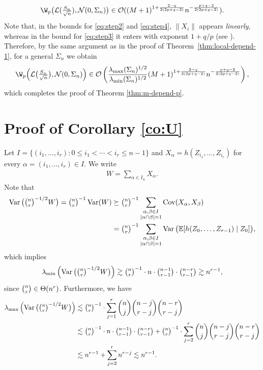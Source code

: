 \documentclass[mnsc,nonblindrev]{informs3}
\begin{document}
\[
\W_p\big(\mathcal{L}(\tfrac{S_n}{\sqrt{n}}),\mathcal{N}(0,\Sigma_n)\big)
\in \mathcal O( (M+1)^{1 + \frac{2-q}{2(2p+q-2)}} n^{-\frac{p+q-2}{2(2 p+q-2)}}).
\]
Note that, in the bounds for \eqref{eq:step2} and \eqref{eq:step4}, 
$\|X_i\|$ appears \emph{linearly}, whereas in the bound for
\eqref{eq:step3} it enters with exponent $1+q/p$ (see \cite[Theorem~6]{bonis2020stein}).
Therefore, by the same argument as in the proof of Theorem~\ref{thm:local-depend-1}, for a general
$\Sigma_n$ we obtain
\[
\W_p\Big(\mathcal{L}\big(\tfrac{S_n}{\sqrt{n}}\big),\mathcal{N}(0,\Sigma_n)\Big)
\in
\mathcal{O}\left(
\frac{\lambda_{\max}(\Sigma_n)^{1/2}}{\lambda_{\min}(\Sigma_n)^{1/2}}
(M+1)^{1+\frac{2-q}{2(2p+q-2)}}
n^{-\frac{p+q-2}{2(2p+q-2)}}
\right),
\]
which completes the proof of Theorem \ref{thm:m-depend-p}.
\section{Proof of Corollary \ref{co:U}}\label{sec:proof-U}
Let $I = \{(i_1, \dots, i_r): 0 \leq i_1<\cdots<i_r\leq n-1\}$ and $X_\alpha = h(Z_{i_1}, \dots, Z_{i_r})$ for every $\alpha = (i_1, \dots, i_r) \in I$. We write 
\begin{align*}
W = \sum_{\alpha \in I_n}X_\alpha.
\end{align*}
Note that
\begin{align*}
\operatorname{Var}\big(\tbinom{n}{r}^{-1/2} W\big)
= \tbinom{n}{r}^{-1}\operatorname{Var}(W)
&\succeq \tbinom{n}{r}^{-1}\sum_{\substack{\alpha,\beta\in I\\ |\alpha\cap\beta|=1}} \operatorname{Cov}(X_\alpha,X_\beta)\\
&= \tbinom{n}{r}^{-1}\sum_{\substack{\alpha,\beta\in I\\ |\alpha\cap\beta|=1}}
\operatorname{Var}\big(\mathbb{E}[h(Z_0,\ldots,Z_{r-1}) \mid Z_0]\big),
\end{align*}
which implies
\begin{align*}
\lambda_{\min}\left(\operatorname{Var}\big(\tbinom{n}{r}^{-1/2} W\big)\right)
\gtrsim
\tbinom{n}{r}^{-1}\cdot n \cdot \tbinom{n-1}{r-1}\cdot \tbinom{n-r}{r-1}
\gtrsim n^{r-1},
\end{align*}
since $\tbinom{n}{r}\in \Theta( n^{r})$. Furthermore, we have
\begin{align*}
\lambda_{\max}\left(\operatorname{Var}\big(\tbinom{n}{r}^{-1/2} W\big)\right)&\lesssim \tbinom{n}{r}^{-1}\cdot \sum_{j=1}^r \binom{n}{j}\binom{n-j}{r-j}\binom{n-r}{r-j}\\
&\lesssim\tbinom{n}{r}^{-1}\cdot n \cdot \tbinom{n-1}{r-1}\cdot \tbinom{n-r}{r-1}+ \tbinom{n}{r}^{-1}\cdot \sum_{j=2}^r \binom{n}{j}\binom{n-j}{r-j}\binom{n-r}{r-j}\\
&\lesssim n^{r-1} + \sum_{j=2}^r n^{r-j} \lesssim n^{r-1}.
\end{align*}
\end{document}
